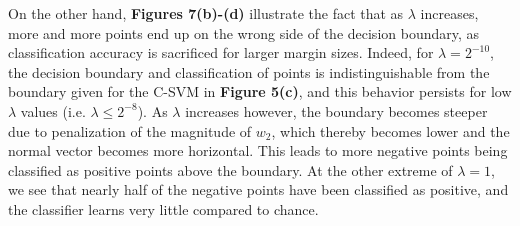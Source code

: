 \documentclass[10pt,psamsfonts]{amsart}
\theoremstyle{definition}
\theoremstyle{remark}
\numberwithin{equation}{section}
\begin{document}
On the other hand, {\bf Figures 7(b)-(d)} illustrate the fact that as $\lambda$ increases, more and more points end up on the wrong side of the decision boundary, as classification accuracy is sacrificed for larger margin sizes. Indeed, for $\lambda = 2^{-10}$, the decision boundary and classification of points is indistinguishable from the boundary given for the C-SVM in {\bf Figure 5(c)}, and this behavior persists for low $\lambda$ values (i.e. $\lambda \leq 2^{-8}$). As $\lambda$ increases however, the boundary becomes steeper due to penalization of the magnitude of $w_2$, which thereby becomes lower and the normal vector becomes more horizontal. This leads to more negative points being classified as positive points above the boundary. At the other extreme of $\lambda = 1$, we see that nearly half of the negative points have been classified as positive, and the classifier learns very little compared to chance.
\end{document}
